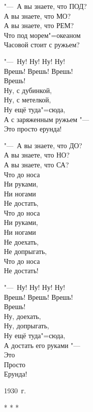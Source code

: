 \begin{flushleft}
"---~А вы знаете, что ПОД? \\
А вы знаете, что МО? \\
А вы знаете, что РЕМ? \\
Что под морем"=океаном \\
Часовой стоит с ружьем?
\end{flushleft}

\begin{flushright}
\begin{minipage}{0.5\textwidth}
"---~Ну! Ну! Ну! Ну! \\
Врешь! \quad Врешь! \quad Врешь! \\
Врешь! \\
Ну, с дубинкой, \\
Ну, с метелкой, \\
Ну ещё туда"=сюда, \\
А с заряженным ружьем "--- \\
Это просто ерунда!
\end{minipage}
\end{flushright}

\begin{flushleft}
"---~А вы знаете, что ДО? \\
А вы знаете, что НО? \\
А вы знаете, что СА? \\
Что до носа \\
Ни руками, \\
Ни ногами \\
Не достать, \\
Что до носа \\
Ни руками, \\
Ни ногами \\
Не доехать, \\
Не допрыгать, \\
Что до носа \\
Не достать!
\end{flushleft}

\begin{flushright}
\begin{minipage}{0.5\textwidth}
"---~Ну! Ну! Ну! Ну! \\
Врешь! \quad Врешь! \quad Врешь! \\
Врешь! \\
Ну, доехать, \\
Ну, допрыгать, \\
Ну ещё туда"=сюда, \\
А достать его руками "--- \\
Это \\
Просто \\
Ерунда!
\end{minipage}
\end{flushright}

\begin{flushright}
1930~г.
\end{flushright}

\begin{center}
* * *
\end{center}